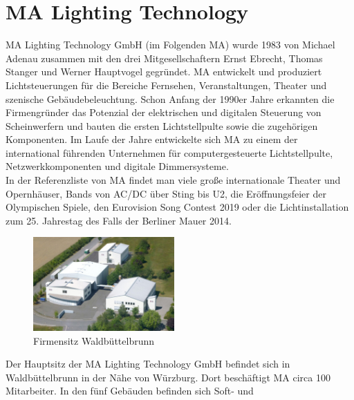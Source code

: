 \documentclass[11pt]{scrartcl}
\begin{document}
\section{MA Lighting Technology}
MA Lighting Technology GmbH (im Folgenden MA) wurde 1983 von Michael Adenau zusammen mit
den drei Mitgesellschaftern Ernst Ebrecht, Thomas Stanger und Werner Hauptvogel gegründet. MA
entwickelt und produziert Lichtsteuerungen für die Bereiche Fernsehen, Veranstaltungen, Theater
und szenische Gebäudebeleuchtung. Schon Anfang der 1990er Jahre erkannten die Firmengründer
das Potenzial der elektrischen und digitalen Steuerung von Scheinwerfern und bauten die ersten
Lichtstellpulte sowie die zugehörigen Komponenten. Im Laufe der Jahre entwickelte sich MA zu
einem der international führenden Unternehmen für computergesteuerte Lichtstellpulte,
Netzwerkkomponenten und digitale Dimmersysteme.\\
In der Referenzliste von MA findet man viele große internationale Theater und Opernhäuser, Bands
von AC/DC über Sting bis U2, die Eröffnungsfeier der Olympischen Spiele, den Eurovision Song
Contest 2019 oder die Lichtinstallation zum 25. Jahrestag des Falls der Berliner Mauer 2014.\\
\begin{figure}
    \vspace{-25pt}
    \begin{center}
        \includegraphics[width=0.48\textwidth]{images/csm_MA_building_WBB.jpg}
    \end{center}
    \vspace{-20pt}
    \captionsetup{justification=raggedright,singlelinecheck=false}
    \caption[Firmensitz Waldbüttelbrunn]{Firmensitz Waldbüttelbrunn \cite{maabout}}
    \vspace{-15pt}
\end{figure}
Der Hauptsitz der MA Lighting Technology GmbH befindet sich in Waldbüttelbrunn in der Nähe von
Würzburg. Dort beschäftigt MA circa 100 Mitarbeiter. In den fünf Gebäuden befinden sich Soft- und
\end{document}
